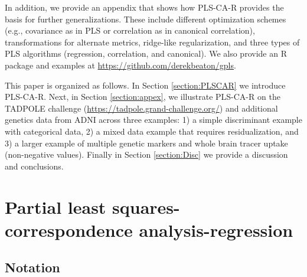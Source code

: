 \documentclass[12pt]{article}
\begin{document}
In addition, we provide an appendix that shows how PLS-CA-R provides the
basis for further generalizations. These include different optimization
schemes (e.g., covariance as in PLS or correlation as in canonical
correlation), transformations for alternate metrics, ridge-like
regularization, and three types of PLS algorithms (regression,
correlation, and canonical). We also provide an R package and examples
at \url{https://github.com/derekbeaton/gpls}.

This paper is organized as follows. In Section \ref{section:PLSCAR} we
introduce PLS-CA-R. Next, in Section \ref{section:appex}, we illustrate
PLS-CA-R on the TADPOLE challenge
(\url{https://tadpole.grand-challenge.org/}) and additional genetics
data from ADNI across three examples: 1) a simple discriminant example
with categorical data, 2) a mixed data example that requires
residualization, and 3) a larger example of multiple genetic markers and
whole brain tracer uptake (non-negative values). Finally in Section
\ref{section:Disc} we provide a discussion and conclusions.

\hypertarget{partial-least-squares-correspondence-analysis-regression}{%
\section{Partial least squares-correspondence
analysis-regression}\label{partial-least-squares-correspondence-analysis-regression}}

\label{section:PLSCAR}

\hypertarget{notation}{%
\subsection{Notation}\label{notation}}
\end{document}
